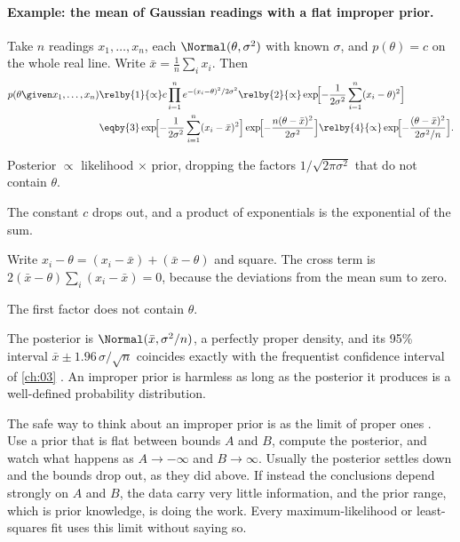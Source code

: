 \paragraph{Example: the mean of Gaussian readings with a flat improper prior.}
Take $n$ readings $x_1,\dots,x_n$, each $\Normal(\theta,\sigma^2)$ with known $\sigma$,
and $p(\theta)=c$ on the whole real line. Write $\bar x=\frac1n\sum_ix_i$. Then
\begin{align*}
  p(\theta\given x_1,\dots,x_n)
  &\relby{1}{\propto} c\prod_{i=1}^n e^{-(x_i-\theta)^2/2\sigma^2}
   \relby{2}{\propto}\exp\!\Bigl[-\frac{1}{2\sigma^2}\sum_{i=1}^n(x_i-\theta)^2\Bigr]\\
  &\eqby{3}\exp\!\Bigl[-\frac{1}{2\sigma^2}\sum_{i=1}^n(x_i-\bar x)^2\Bigr]
     \exp\!\Bigl[-\frac{n(\theta-\bar x)^2}{2\sigma^2}\Bigr]
   \relby{4}{\propto}\exp\!\Bigl[-\frac{(\theta-\bar x)^2}{2\sigma^2/n}\Bigr].
\end{align*}
\begin{explain}
  \item Posterior $\propto$ likelihood $\times$ prior, dropping the factors
        $1/\sqrt{2\pi\sigma^2}$ that do not contain $\theta$.
  \item The constant $c$ drops out, and a product of exponentials is the exponential of
        the sum.
  \item Write $x_i-\theta=(x_i-\bar x)+(\bar x-\theta)$ and square. The cross term is
        $2(\bar x-\theta)\sum_i(x_i-\bar x)=0$, because the deviations from the mean sum
        to zero.
  \item The first factor does not contain $\theta$.
\end{explain}
The posterior is $\Normal(\bar x,\sigma^2/n)$, a perfectly proper density, and its
95\% interval $\bar x\pm1.96\,\sigma/\sqrt n$ coincides exactly with the frequentist
confidence interval of \cref{ch:03} . An improper prior is harmless as
long as the posterior it produces is a well-defined probability distribution.

The safe way to think about an improper prior is as the limit of proper ones
. Use a prior that is flat between bounds $A$ and $B$, compute the
posterior, and watch what happens as $A\to-\infty$ and $B\to\infty$. Usually the
posterior settles down and the bounds drop out, as they did above. If instead the
conclusions depend strongly on $A$ and $B$, the data carry very little information, and
the prior range, which is prior knowledge, is doing the work. Every maximum-likelihood or
least-squares fit uses this limit without saying so.


